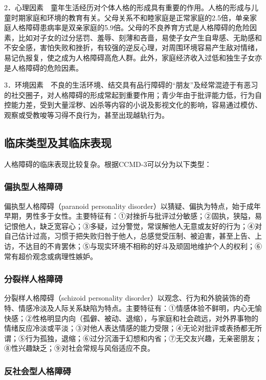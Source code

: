 2．心理因素　童年生活经历对个体人格的形成具有重要的作用。人格的形成与儿童时期家庭和环境的教育有关。父母关系不和睦家庭是正常家庭的2.5倍，单亲家庭人格障碍患病率是双亲家庭的5.9倍。父母的不良养育方式是人格障碍的危险因素，比如对子女的过分惩罚、羞辱、刻薄和吝啬，易使子女产生自卑感、无助感和不安全感，害怕失败和挫折，有较强的逆反心理，对周围环境容易产生敌对情绪，易记仇报复，使之成为人格障碍高危人群。此外，家庭经济收入过低和独生子女亦是人格障碍的危险因素。

3．环境因素　不良的生活环境、结交具有品行障碍的“朋友”及经常混迹于有恶习的社交圈子，对人格障碍的形成常起到重要作用；青少年由于批评能力低，行为自控能力差，受到大量淫秽、凶杀等内容的小说及影视文化的影响，容易通过模仿、观察或受教唆等习得不良行为，甚至出现越轨行为。

\subsection{临床类型及其临床表现}

人格障碍的临床表现比较复杂。根据CCMD-3可以分为以下类型：

\subsubsection{偏执型人格障碍}

偏执型人格障碍（paranoid personality
disorder）以猜疑、偏执为特点，始于成年早期，男性多于女性。主要特征有：①对挫折与批评过分敏感；②固执，狭隘，易记恨他人，缺乏宽容心；③多疑，过分警觉，常误解他人无意或友好的行为；④对自己估计过高，习惯于把失败归咎于他人，总感觉受压制、被迫害，甚至上告、上访，不达目的不肯罢休；⑤与现实环境不相称的好斗及顽固地维护个人的权利；⑥常有超价观念或病理性嫉妒。

\subsubsection{分裂样人格障碍}

分裂样人格障碍（schizoid personality
disorder）以观念、行为和外貌装饰的奇特、情感冷淡及人际关系缺陷为特点。主要特征有：①情感体验不鲜明，内心无愉快感；②性格明显内向（孤僻、被动、退缩），与家庭和社会疏远，对外界事物的情绪反应冷淡或平淡；③对他人表达情感的能力受限；④无论对批评或表扬都无所谓；⑤行为孤独，退缩；⑥过分沉湎于幻想和内省；⑦无交友兴趣，无亲密朋友；⑧性兴趣缺乏；⑨对社会常规与风俗适应不良。

\subsubsection{反社会型人格障碍}

